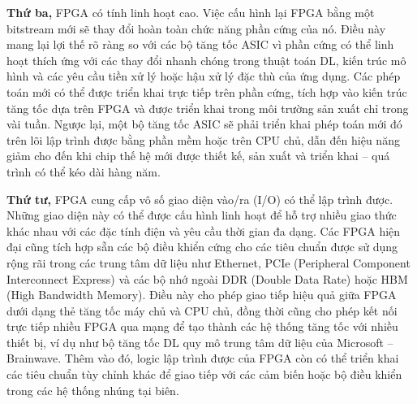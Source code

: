 \documentclass[a4paper]{article}
\begin{document}
\textbf{Thứ ba,} FPGA có tính linh hoạt cao. Việc cấu hình lại FPGA bằng một bitstream mới sẽ thay đổi hoàn toàn chức năng phần cứng của nó. Điều này mang lại lợi thế rõ ràng so với các bộ tăng tốc ASIC vì phần cứng có thể linh hoạt thích ứng với các thay đổi nhanh chóng trong thuật toán DL, kiến trúc mô hình và các yêu cầu tiền xử lý hoặc hậu xử lý đặc thù của ứng dụng. Các phép toán mới có thể được triển khai trực tiếp trên phần cứng, tích hợp vào kiến trúc tăng tốc dựa trên FPGA và được triển khai trong môi trường sản xuất chỉ trong vài tuần. Ngược lại, một bộ tăng tốc ASIC sẽ phải triển khai phép toán mới đó trên lõi lập trình được bằng phần mềm hoặc trên CPU chủ, dẫn đến hiệu năng giảm cho đến khi chip thế hệ mới được thiết kế, sản xuất và triển khai – quá trình có thể kéo dài hàng năm.

\textbf{Thứ tư,} FPGA cung cấp vô số giao diện vào/ra (I/O) có thể lập trình được. Những giao diện này có thể được cấu hình linh hoạt để hỗ trợ nhiều giao thức khác nhau với các đặc tính điện và yêu cầu thời gian đa dạng. Các FPGA hiện đại cũng tích hợp sẵn các bộ điều khiển cứng cho các tiêu chuẩn được sử dụng rộng rãi trong các trung tâm dữ liệu như Ethernet, PCIe (Peripheral Component Interconnect Express) và các bộ nhớ ngoài DDR (Double Data Rate) hoặc HBM (High Bandwidth Memory). Điều này cho phép giao tiếp hiệu quả giữa FPGA dưới dạng thẻ tăng tốc máy chủ và CPU chủ, đồng thời cũng cho phép kết nối trực tiếp nhiều FPGA qua mạng để tạo thành các hệ thống tăng tốc với nhiều thiết bị, ví dụ như bộ tăng tốc DL quy mô trung tâm dữ liệu của Microsoft – Brainwave. Thêm vào đó, logic lập trình được của FPGA còn có thể triển khai các tiêu chuẩn tùy chỉnh khác để giao tiếp với các cảm biến hoặc bộ điều khiển trong các hệ thống nhúng tại biên.
\end{document}
